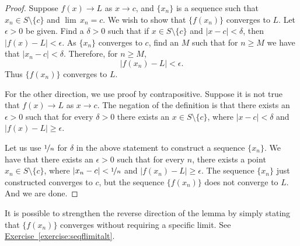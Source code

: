 \documentclass[12pt]{book}
\newcommand{\abs}[1]{\left\lvert {#1} \right\rvert}
\theoremstyle{plain}
\theoremstyle{remark}
\theoremstyle{definition}
\theoremstyle{exercise}
\theoremstyle{example}
\newcommand{\exerciseref}[1]{\hyperref[#1]{Exercise~\ref*{#1}}}
\begin{document}
\begin{proof}
Suppose 
$f(x) \to L$ as $x \to c$, and $\{ x_n \}$ is a sequence
such that
$x_n \in S \setminus \{c\}$ and
$\lim\, x_n = c$.
We wish to show that $\{ f(x_n) \}$ converges to $L$.
Let $\epsilon > 0$ be given.  Find a $\delta > 0$ such that
if $x \in S \setminus \{c\}$ and $\abs{x-c} < \delta$, then
$\abs{f(x) - L} < \epsilon$.  As
$\{ x_n \}$  converges to $c$, find an $M$ such that for $n \geq M$
we have that $\abs{x_n - c} < \delta$.  Therefore, for $n \geq M$,
\begin{equation*}
\abs{f(x_n) - L} < \epsilon .
\end{equation*}
Thus $\{ f(x_n) \}$ converges to $L$.

For the other direction, we use proof by contrapositive.  Suppose 
it is not true that $f(x) \to L$ as $x \to c$.  The negation of the
definition is that there exists an $\epsilon > 0$ such that for every
$\delta > 0$ there exists an $x \in S \setminus \{c\}$, where
$\abs{x-c} < \delta$
and $\abs{f(x)-L} \geq \epsilon$.

Let us use $\nicefrac{1}{n}$ for $\delta$ in the above statement to
construct a sequence $\{ x_n \}$.  We have
that there exists an $\epsilon > 0$ such that for every $n$,
there exists a point $x_n \in S \setminus \{c\}$, where
$\abs{x_n-c} < \nicefrac{1}{n}$
and $\abs{f(x_n)-L} \geq \epsilon$.
The sequence $\{ x_n \}$ just constructed converges to $c$, but
the sequence $\{ f(x_n) \}$ does not converge to $L$.
And we are done.
\end{proof}

It is possible to strengthen the reverse direction of
the lemma by simply stating that
$\{ f(x_n) \}$ converges without requiring a specific limit.
See \exerciseref{exercise:seqflimitalt}.
\end{document}
